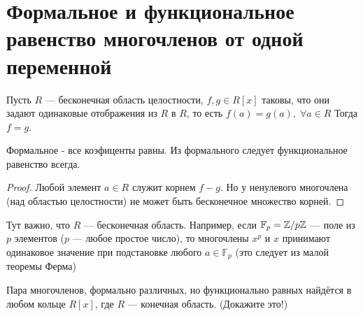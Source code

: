 \section{Формальное и функциональное равенство многочленов от одной переменной}
\begin{normalsize}
\begin{theorem-non}
    Пусть $R$ --- бесконечная область целостности, $f,g \in R[x]$ таковы,
    что они задают одинаковые отображения из $R$ в $R$, то есть
    $f(a) = g(a),\; \forall a \in R$
    Тогда $f = g$. 
\end{theorem-non}
Формальное - все коэфиценты равны.
Из формального следует функциональное равенство всегда.
\begin{proof}
    Любой элемент $a \in R$ служит корнем $f - g$.
    Но у ненулевого многочлена (над областью целостности) не может
    быть бесконечное множество корней. 
\end{proof}

\notice 
Тут важно, что $R$ --- бесконечная область. Например, если
$\mathbb{F}_p = \mathbb{Z} /p\mathbb{Z}$ --- поле из $p$ элементов ($p$ --- любое простое число), то
многочлены $x^p$ и $x$ принимают одинаковое значение при подстановке любого $a \in \mathbb{F}_p$ (это следует из малой теоремы Ферма)

Пара многочленов, формально различных, но функционально равных найдётся в любом кольце $R[x]$, где $R$ --- конечная область. (Докажите это!)
\end{normalsize}